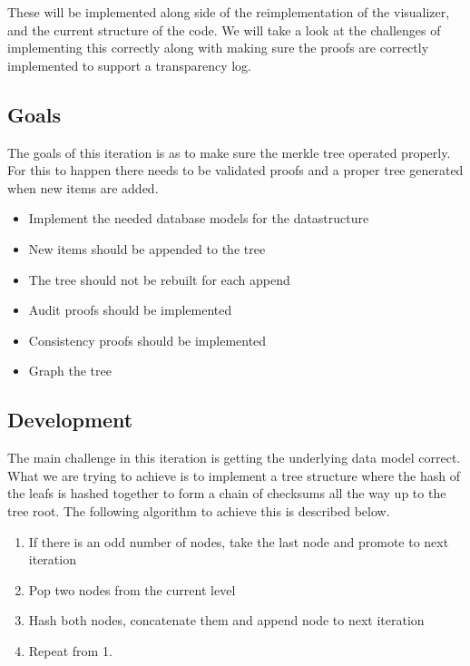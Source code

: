 \documentclass[../Main/thesis.tex]{subfiles}
\begin{document}
These will be implemented along side of the reimplementation of the visualizer,
and the current structure of the code. We will take a look at the challenges of
implementing this correctly along with making sure the proofs are correctly
implemented to support a transparency log.

\subsection*{Goals}%
\label{sub:second_iteration_goals}
The goals of this iteration is as to make sure the merkle tree operated
properly. For this to happen there needs to be validated proofs and a proper
tree generated when new items are added.

\begin{itemize}
    \item Implement the needed database models for the datastructure
    \item New items should be appended to the tree
    \item The tree should not be rebuilt for each append
    \item Audit proofs should be implemented
    \item Consistency proofs should be implemented
    \item Graph the tree
\end{itemize}


\subsection*{Development}%
\label{sub:second_iteration_development}
The main challenge in this iteration is getting the underlying data model
correct. What we are trying to achieve is to implement a tree structure where
the hash of the leafs is hashed together to form a chain of checksums all the
way up to the tree root. The following algorithm to achieve this is described
below.

\begin{enumerate}
    \item If there is an odd number of nodes, take the last node and promote to
        next iteration
    \item Pop two nodes from the current level
    \item Hash both nodes, concatenate them and append node to next iteration
    \item Repeat from 1.
\end{enumerate}
\end{document}
